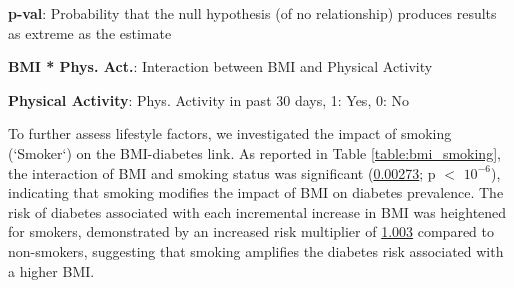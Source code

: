 \documentclass[11pt]{article}
\begin{document}
\begin{table}[h]
\begin{threeparttable}
\begin{tablenotes}
\item \textbf{p-val}: Probability that the null hypothesis (of no relationship) produces results as extreme as the estimate
\item \textbf{BMI * Phys. Act.}: Interaction between BMI and Physical Activity
\item \textbf{Physical Activity}: Phys. Activity in past 30 days, 1: Yes, 0: No
\end{tablenotes}
\end{threeparttable}
\end{table}


To further assess lifestyle factors, we investigated the impact of smoking (`Smoker`) on the BMI-diabetes link. As reported in Table \ref{table:bmi_smoking}, the interaction of BMI and smoking status was significant (\hyperlink{C4a}{0.00273}; p $<$ \hyperlink{C4d}{$10^{-6}$}), indicating that smoking modifies the impact of BMI on diabetes prevalence. The risk of diabetes associated with each incremental increase in BMI was heightened for smokers, demonstrated by an increased risk multiplier of \hyperlink{results1}{1.003} compared to non-smokers, suggesting that smoking amplifies the diabetes risk associated with a higher BMI.
\end{document}
